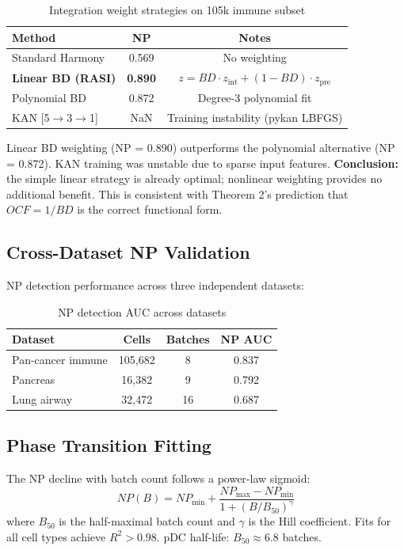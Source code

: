 \documentclass[10pt]{article}
\begin{document}
\begin{table}[h]
\centering
\caption{Integration weight strategies on 105k immune subset}
\begin{tabular}{lcc}
\toprule
Method & NP & Notes \\
\midrule
Standard Harmony & 0.569 & No weighting \\
\textbf{Linear BD (RASI)} & \textbf{0.890} & $z = BD \cdot z_{\text{int}} + (1-BD) \cdot z_{\text{pre}}$ \\
Polynomial BD & 0.872 & Degree-3 polynomial fit \\
KAN [5$\to$3$\to$1] & NaN & Training instability (pykan LBFGS) \\
\bottomrule
\end{tabular}
\end{table}

Linear BD weighting (NP = 0.890) outperforms the polynomial alternative (NP = 0.872). KAN training was unstable due to sparse input features. \textbf{Conclusion:} the simple linear strategy is already optimal; nonlinear weighting provides no additional benefit. This is consistent with Theorem 2's prediction that $OCF = 1/BD$ is the correct functional form.

\subsection{Cross-Dataset NP Validation}

NP detection performance across three independent datasets:

\begin{table}[h]
\centering
\caption{NP detection AUC across datasets}
\begin{tabular}{lccc}
\toprule
Dataset & Cells & Batches & NP AUC \\
\midrule
Pan-cancer immune & 105,682 & 8 & 0.837 \\
Pancreas & 16,382 & 9 & 0.792 \\
Lung airway & 32,472 & 16 & 0.687 \\
\bottomrule
\end{tabular}
\end{table}

\subsection{Phase Transition Fitting}

The NP decline with batch count follows a power-law sigmoid:
\[
NP(B) = NP_{\min} + \frac{NP_{\max} - NP_{\min}}{1 + (B/B_{50})^\gamma}
\]
where $B_{50}$ is the half-maximal batch count and $\gamma$ is the Hill coefficient. Fits for all cell types achieve $R^2 > 0.98$. pDC half-life: $B_{50} \approx 6.8$ batches.
\end{document}
